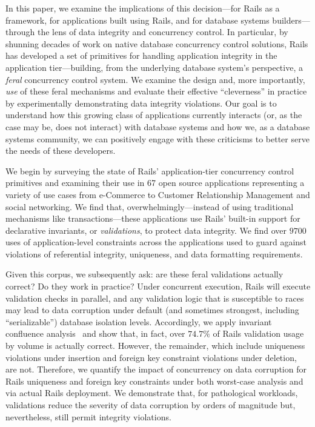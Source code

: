 In this paper, we examine the implications of this decision---for
Rails as a framework, for applications built using Rails, and for
database systems builders---through the lens of data integrity and
concurrency control. In particular, by shunning decades of work on
native database concurrency control solutions, Rails has developed a
set of primitives for handling application integrity in the
application tier---building, from the underlying database system's
perspective, a \textit{feral} concurrency control system. We examine
the design and, more importantly, \textit{use} of these feral
mechanisms and evaluate their effective ``cleverness'' in practice by
experimentally demonstrating data integrity violations. Our goal is to
understand how this growing class of applications currently interacts
(or, as the case may be, does not interact) with database systems and
how we, as a database systems community, we can positively engage with
these criticisms to better serve the needs of these developers.

We begin by surveying the state of Rails' application-tier concurrency
control primitives and examining their use in 67 open source
applications representing a variety of use cases from e-Commerce to
Customer Relationship Management and social networking. We find that,
overwhelmingly---instead of using traditional mechanisms like
transactions---these applications use Rails' built-in support for
declarative invariants, or \textit{validations}, to protect data
integrity. We find over $9700$ uses of application-level constraints
across the applications used to guard against violations of
referential integrity, uniqueness, and data formatting requirements.

Given this corpus, we subsequently ask: are these feral validations
actually correct? Do they work in practice? Under concurrent
execution, Rails will execute validation checks in parallel, and any
validation logic that is susceptible to races may lead to data
corruption under default (and sometimes strongest, including
``serializable'') database isolation levels. Accordingly, we apply
invariant confluence analysis~\cite{coord-avoid} and show that, in
fact, over $74.7\%$ of Rails validation usage by volume is actually
correct. However, the remainder, which include uniqueness violations
under insertion and foreign key constraint violations under deletion,
are not. Therefore, we quantify the impact of concurrency on data
corruption for Rails uniqueness and foreign key constraints under both
worst-case analysis and via actual Rails deployment. We demonstrate
that, for pathological workloads, validations reduce the severity of
data corruption by orders of magnitude but, nevertheless, still permit
integrity violations.

